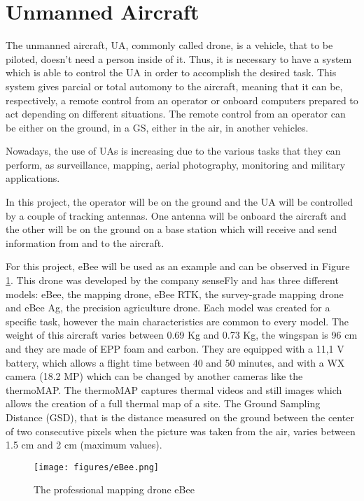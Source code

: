 \section{Unmanned Aircraft}\label{sec:drone}

The unmanned aircraft, UA, commonly called drone, is a vehicle, that to be piloted, doesn't need a person inside of it. Thus, it is necessary to have a system which is able to control the UA in order to accomplish the desired task. This system gives parcial or total automony to the aircraft, meaning that it can be, respectively, a remote control from an operator or onboard computers prepared to act depending on different situations. The remote control from an operator can be either on the ground, in a GS, either in the air, in another vehicles.

Nowadays, the use of UAs is increasing due to the various tasks that they can perform, as surveillance, mapping, aerial photography, monitoring and military applications.

In this project, the operator will be on the ground and the UA will be controlled by a couple of tracking antennas. One antenna will be onboard the aircraft and the other will be on the ground on a base station which will receive and send information from and to the aircraft. 

For this project, eBee will be used as an example and can be observed in Figure \ref{fig:ebee}. This drone was developed by the company senseFly and has three different models: eBee, the mapping drone, eBee RTK, the survey-grade mapping drone and eBee Ag, the precision agriculture drone. Each model was created for a specific task, however the main characteristics are common to every model. The weight of this aircraft varies between 0.69 Kg and 0.73 Kg, the wingspan is 96 cm and they are made of EPP foam and carbon. They are equipped with a 11,1 V battery, which allows a flight time between 40 and 50 minutes, and with a WX camera (18.2 MP) which can be changed by another cameras like the thermoMAP. The thermoMAP captures thermal videos and still images which allows the creation of a full thermal map of a site. The Ground Sampling Distance (GSD), that is the distance measured on the ground between the center of two consecutive pixels when the picture was taken from the air, varies between 1.5 cm and 2 cm (maximum values). 
 
\begin{figure}[H]
  \centering
  \texttt{[image: figures/eBee.png]}
   \caption{The professional mapping drone eBee}
   \label{fig:ebee}
\end{figure}

